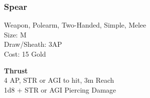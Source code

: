 \subsubsection{Spear}\label{weapon:spear}
Weapon, Polearm, Two-Handed, Simple, Melee\\
Size: M\\
Draw/Sheath: 3AP\\
Cost: 15 Gold

\textbf{Thrust}\\
4 AP, STR or AGI to hit, 3m Reach\\
1d8 + \texttimes STR or AGI Piercing Damage

